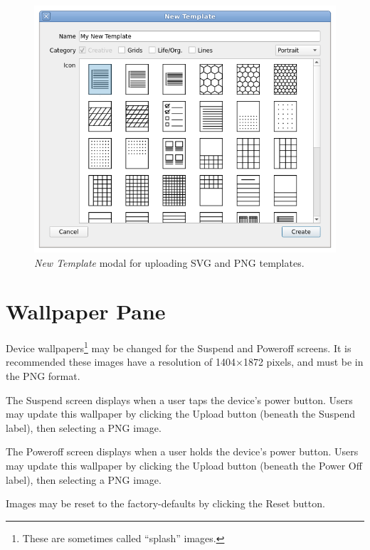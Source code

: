 \documentclass{memoir}
\begin{document}
{\newpage
\mbox{}
\vfill
\begin{figure}[h]
  \centering
  \includegraphics[width=\linewidth]{images/template-modal.png}
  \caption{\textit{New Template} modal for uploading SVG and PNG templates.}
  \label{fig:templatesmodal}
\end{figure}
\vfill


\newpage
\section{Wallpaper Pane}
\label{sec:wallpaperpane}
Device wallpapers\footnote{These are sometimes called ``splash'' images.} may be changed for the Suspend and Poweroff screens. It is recommended these images have a resolution of 1404$\times$1872 pixels, and must be in the PNG format.

The Suspend screen displays when a user taps the device's power button. Users may update this wallpaper by clicking the Upload button (beneath the Suspend label), then selecting a PNG image.

The Poweroff screen displays when a user holds the device's power button. Users may update this wallpaper by clicking the Upload button (beneath the Power Off label), then selecting a PNG image.

Images may be reset to the factory-defaults by clicking the Reset button.

}
\end{document}
